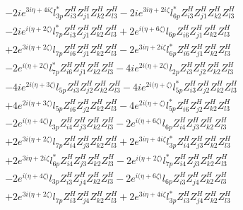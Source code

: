  \begin{align} 
 & -2 i e^{3 i \eta +4 i \zeta } l_{3p}^* Z_{{i 3}}^{H} Z_{{j 1}}^{H} Z_{{k 2}}^{H} Z_{{l 3}}^{H} -2 i e^{3 i \eta +2 i \zeta } l_{6p}^* Z_{{i 3}}^{H} Z_{{j 1}}^{H} Z_{{k 2}}^{H} Z_{{l 3}}^{H} \nonumber \\ 
 &-2 i e^{i \Big(\eta +2 \zeta \Big)} l_{7p}^* Z_{{i 3}}^{H} Z_{{j 1}}^{H} Z_{{k 2}}^{H} Z_{{l 3}}^{H} +2 e^{i \Big(\eta +6 \zeta \Big)} l_{6p} Z_{{i 6}}^{H} Z_{{j 1}}^{H} Z_{{k 2}}^{H} Z_{{l 3}}^{H} \nonumber \\ 
 &+2 e^{3 i \Big(\eta +2 \zeta \Big)} l_{7p} Z_{{i 6}}^{H} Z_{{j 1}}^{H} Z_{{k 2}}^{H} Z_{{l 3}}^{H} -2 e^{3 i \eta +2 i \zeta } l_{6p}^* Z_{{i 6}}^{H} Z_{{j 1}}^{H} Z_{{k 2}}^{H} Z_{{l 3}}^{H} \nonumber \\ 
 &-2 e^{i \Big(\eta +2 \zeta \Big)} l_{7p}^* Z_{{i 6}}^{H} Z_{{j 1}}^{H} Z_{{k 2}}^{H} Z_{{l 3}}^{H} -4 i e^{2 i \Big(\eta +2 \zeta \Big)} l_{2p} Z_{{i 3}}^{H} Z_{{j 2}}^{H} Z_{{k 2}}^{H} Z_{{l 3}}^{H} \nonumber \\ 
 &-4 i e^{2 i \Big(\eta +3 \zeta \Big)} l_{5p} Z_{{i 3}}^{H} Z_{{j 2}}^{H} Z_{{k 2}}^{H} Z_{{l 3}}^{H} -4 i e^{2 i \Big(\eta +\zeta \Big)} l_{5p}^* Z_{{i 3}}^{H} Z_{{j 2}}^{H} Z_{{k 2}}^{H} Z_{{l 3}}^{H} \nonumber \\ 
 &+4 e^{2 i \Big(\eta +3 \zeta \Big)} l_{5p} Z_{{i 6}}^{H} Z_{{j 2}}^{H} Z_{{k 2}}^{H} Z_{{l 3}}^{H} -4 e^{2 i \Big(\eta +\zeta \Big)} l_{5p}^* Z_{{i 6}}^{H} Z_{{j 2}}^{H} Z_{{k 2}}^{H} Z_{{l 3}}^{H} \nonumber \\ 
 &-2 e^{i \Big(\eta +4 \zeta \Big)} l_{3p} Z_{{i 4}}^{H} Z_{{j 3}}^{H} Z_{{k 2}}^{H} Z_{{l 3}}^{H} -2 e^{i \Big(\eta +6 \zeta \Big)} l_{6p} Z_{{i 4}}^{H} Z_{{j 3}}^{H} Z_{{k 2}}^{H} Z_{{l 3}}^{H} \nonumber \\ 
 &+2 e^{3 i \Big(\eta +2 \zeta \Big)} l_{7p} Z_{{i 4}}^{H} Z_{{j 3}}^{H} Z_{{k 2}}^{H} Z_{{l 3}}^{H} +2 e^{3 i \eta +4 i \zeta } l_{3p}^* Z_{{i 4}}^{H} Z_{{j 3}}^{H} Z_{{k 2}}^{H} Z_{{l 3}}^{H} \nonumber \\ 
 &+2 e^{3 i \eta +2 i \zeta } l_{6p}^* Z_{{i 4}}^{H} Z_{{j 3}}^{H} Z_{{k 2}}^{H} Z_{{l 3}}^{H} -2 e^{i \Big(\eta +2 \zeta \Big)} l_{7p}^* Z_{{i 4}}^{H} Z_{{j 3}}^{H} Z_{{k 2}}^{H} Z_{{l 3}}^{H} \nonumber \\ 
 &-2 e^{i \Big(\eta +4 \zeta \Big)} l_{3p} Z_{{i 3}}^{H} Z_{{j 4}}^{H} Z_{{k 2}}^{H} Z_{{l 3}}^{H} -2 e^{i \Big(\eta +6 \zeta \Big)} l_{6p} Z_{{i 3}}^{H} Z_{{j 4}}^{H} Z_{{k 2}}^{H} Z_{{l 3}}^{H} \nonumber \\ 
 &+2 e^{3 i \Big(\eta +2 \zeta \Big)} l_{7p} Z_{{i 3}}^{H} Z_{{j 4}}^{H} Z_{{k 2}}^{H} Z_{{l 3}}^{H} +2 e^{3 i \eta +4 i \zeta } l_{3p}^* Z_{{i 3}}^{H} Z_{{j 4}}^{H} Z_{{k 2}}^{H} Z_{{l 3}}^{H} \nonumber \\ 

\end{align}
